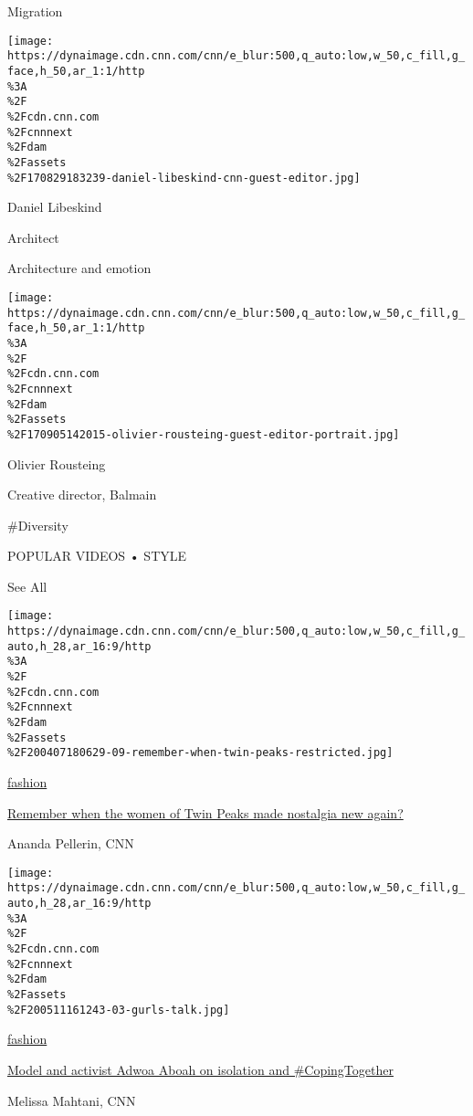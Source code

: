 Migration

\href{/style/profiles/daniel-libeskind}{}

\texttt{[image: https://dynaimage.cdn.cnn.com/cnn/e\_blur:500,q\_auto:low,w\_50,c\_fill,g\_face,h\_50,ar\_1:1/http\\\%3A\\\%2F\\\%2Fcdn.cnn.com\\\%2Fcnnnext\\\%2Fdam\\\%2Fassets\\\%2F170829183239-daniel-libeskind-cnn-guest-editor.jpg]}

Daniel Libeskind

Architect

Architecture and emotion

\href{/style/profiles/olivier-rousteing}{}

\texttt{[image: https://dynaimage.cdn.cnn.com/cnn/e\_blur:500,q\_auto:low,w\_50,c\_fill,g\_face,h\_50,ar\_1:1/http\\\%3A\\\%2F\\\%2Fcdn.cnn.com\\\%2Fcnnnext\\\%2Fdam\\\%2Fassets\\\%2F170905142015-olivier-rousteing-guest-editor-portrait.jpg]}

Olivier Rousteing

Creative director, Balmain

\#Diversity

POPULAR VIDEOS • STYLE\href{/style/videos}{}

See All

\href{/style/article/remember-when-twin-peaks-david-lynch/index.html}{}

\texttt{[image: https://dynaimage.cdn.cnn.com/cnn/e\_blur:500,q\_auto:low,w\_50,c\_fill,g\_auto,h\_28,ar\_16:9/http\\\%3A\\\%2F\\\%2Fcdn.cnn.com\\\%2Fcnnnext\\\%2Fdam\\\%2Fassets\\\%2F200407180629-09-remember-when-twin-peaks-restricted.jpg]}

\href{/style/fashion}{fashion}

\href{/style/article/remember-when-twin-peaks-david-lynch/index.html}{Remember
when the women of Twin Peaks made nostalgia new again?}

Ananda Pellerin, CNN

\href{/style/article/adwoa-aboah-coronavirus-mental-health/index.html}{}

\texttt{[image: https://dynaimage.cdn.cnn.com/cnn/e\_blur:500,q\_auto:low,w\_50,c\_fill,g\_auto,h\_28,ar\_16:9/http\\\%3A\\\%2F\\\%2Fcdn.cnn.com\\\%2Fcnnnext\\\%2Fdam\\\%2Fassets\\\%2F200511161243-03-gurls-talk.jpg]}

\href{/style/fashion}{fashion}

\href{/style/article/adwoa-aboah-coronavirus-mental-health/index.html}{Model
and activist Adwoa Aboah on isolation and \#CopingTogether}

Melissa Mahtani, CNN

\href{/style/article/red-lipstick-history-beauty/index.html}{}

